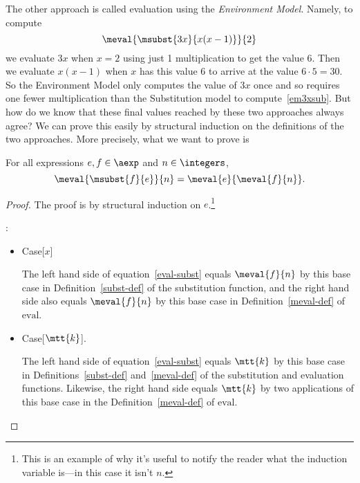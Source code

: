 \begin{definition}
The other approach is called evaluation using the \emph{Environment
  Model}.  Namely, to compute
\begin{equation}\label{em3xsub}
\meval{\msubst{3x}{x(x-1)}}{2}
\end{equation}
we evaluate $3x$ when $x = 2$ using just 1 multiplication to get the value
6.  Then we evaluate $x(x-1)$ when $x$ has this value 6 to arrive at the
value $6\cdot 5=30$.  So the Environment Model only computes the value of
$3x$ once and so requires one fewer multiplication than the Substitution
model to compute~\eqref{em3xsub}.  But how do we know that these final
values reached by these two approaches always agree?  We can prove this
easily by structural induction on the definitions of the two approaches.
More precisely, what we want to prove is

\begin{theorem}\label{environments}
For all expressions $e,f \in \aexp$ and $n \in \integers$,
\begin{equation}\label{eval-subst}
\meval{\msubst{f}{e}}{n} = \meval{e}{\meval{f}{n}}.
\end{equation}
\end{theorem}

\begin{proof}
The proof is by structural induction on $e$.\footnote{This is an
  example of why it's useful to notify the reader what the induction
  variable is---in this case it isn't $n$.}

:
\begin{itemize}

\item Case[$x$]

  The left hand side of equation~\eqref{eval-subst} equals $\meval{f}{n}$
  by this base case in Definition~\ref{subst-def} of the substitution
  function, and the right hand side also equals $\meval{f}{n}$ by this base
  case in Definition~\ref{meval-def} of $\text{eval}$.

\item Case[$\mtt{k}$].

  The left hand side of equation~\eqref{eval-subst} equals $\mtt{k}$ by
  this base case in Definitions~\ref{subst-def} and~\ref{meval-def} of
  the substitution and evaluation functions.  Likewise, the right hand
  side equals $\mtt{k}$ by two applications of this base case in the
  Definition~\ref{meval-def} of $\text{eval}$.

\end{itemize}


\end{proof}
\end{definition}
